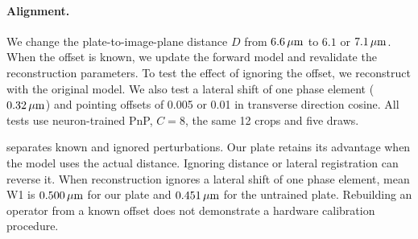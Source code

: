 \paragraph{Alignment.}
We change the plate-to-image-plane distance $D$ from $6.6\,\mu\mathrm{m}$ to $6.1$ or $7.1\,\mu\mathrm{m}$. When the offset is known, we update the forward model and revalidate the reconstruction parameters. To test the effect of ignoring the offset, we reconstruct with the original model. We also test a lateral shift of one phase element ($0.32\,\mu\mathrm{m}$) and pointing offsets of 0.005 or 0.01 in transverse direction cosine. All tests use neuron-trained PnP, $C=8$, the same 12 crops and five draws.

 separates known and ignored perturbations. Our plate retains its advantage when the model uses the actual distance. Ignoring distance or lateral registration can reverse it. When reconstruction ignores a lateral shift of one phase element, mean W1 is $0.500\,\mu\mathrm{m}$ for our plate and $0.451\,\mu\mathrm{m}$ for the untrained plate. Rebuilding an operator from a known offset does not demonstrate a hardware calibration procedure.

